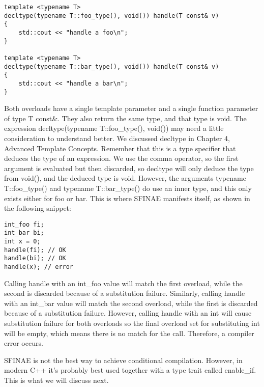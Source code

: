 \begin{lstlisting}[style=styleCXX]
template <typename T>
decltype(typename T::foo_type(), void()) handle(T const& v)
{
	std::cout << "handle a foo\n";
}

template <typename T>
decltype(typename T::bar_type(), void()) handle(T const& v)
{
	std::cout << "handle a bar\n";
}
\end{lstlisting}

Both overloads have a single template parameter and a single function parameter of type T const\&. They also return the same type, and that type is void. The expression decltype(typename T::foo\_type(), void()) may need a little consideration to understand better. We discussed decltype in Chapter 4, Advanced Template Concepts. Remember that this is a type specifier that deduces the type of an expression. We use the comma operator, so the first argument is evaluated but then discarded, so decltype will only deduce the type from void(), and the deduced type is void. However, the arguments typename T::foo\_type() and typename T::bar\_type() do use an inner type, and this only exists either for foo or bar. This is where SFINAE manifests itself, as shown in the following snippet:

\begin{lstlisting}[style=styleCXX]
int_foo fi;
int_bar bi;
int x = 0;
handle(fi); // OK
handle(bi); // OK
handle(x); // error
\end{lstlisting}

Calling handle with an int\_foo value will match the first overload, while the second is discarded because of a substitution failure. Similarly, calling handle with an int\_bar value will match the second overload, while the first is discarded because of a substitution failure. However, calling handle with an int will cause substitution failure for both overloads so the final overload set for substituting int will be empty, which means there is no match for the call. Therefore, a compiler error occurs.

SFINAE is not the best way to achieve conditional compilation. However, in modern C++ it’s probably best used together with a type trait called enable\_if. This is what we will discuss next.






















